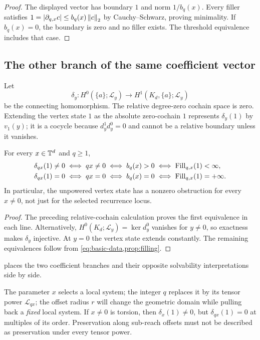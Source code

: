 \documentclass[11pt,a4paper]{article}
\begin{document}
\begin{proof}
The displayed vector has boundary $1$ and norm $1/b_q(x)$.  Every filler
satisfies $1=|\partial_{q,x}c|\leq b_q(x)\left\lVert c\right\rVert_2$ by
Cauchy--Schwarz, proving minimality.  If $b_q(x)=0$, the boundary is zero
and no filler exists.  The threshold equivalence includes that case.
\end{proof}

\subsection{The other branch of the same coefficient vector}

Let
\[
 \delta_y:H^0(\{a\};\mathcal L_y)\longrightarrow
                    H^1(K_d,\{a\};\mathcal L_y)
\]
be the connecting homomorphism.  The relative degree-zero cochain space
is zero.  Extending the vertex state $1$ as the absolute zero-cochain $1$
represents $\delta_y(1)$ by $v_1(y)$; it is a cocycle because
$d^1_y d^0_y=0$ and cannot be a relative boundary unless it vanishes.

\begin{proposition}
\label{prop:two-events}
For every $x\in\mathbb T^d$ and $q\geq1$,
\begin{align}
 \delta_{qx}(1)\ne0
  &\iff qx\ne0\iff b_q(x)>0\iff\operatorname{Fill}_{q,x}(1)<\infty,
  \label{eq:nontrivial-case}\\
 \delta_{qx}(1)=0
  &\iff qx=0\iff b_q(x)=0\iff\operatorname{Fill}_{q,x}(1)=+\infty.
  \label{eq:trivial-case}
\end{align}
In particular, the unpowered vertex state has a nonzero obstruction for
every $x\ne0$, not just for the selected recurrence locus.
\end{proposition}

\begin{proof}
The preceding relative-cochain calculation proves the first equivalence
in each line.  Alternatively, $H^0(K_d;\mathcal L_y)=\ker d^0_y$
vanishes for $y\ne0$, so exactness makes $\delta_y$ injective.  At $y=0$
the vertex state extends constantly.  The remaining equivalences follow
from \cref{eq:basic-data,prop:filling}.
\end{proof}

 places the two coefficient branches and
their opposite solvability interpretations side by side.


\begin{remark}\label{rem:three-scales}
The parameter $x$ selects a local system; the integer $q$ replaces it by
its tensor power $\mathcal L_{qx}$; the offset radius $r$ will change the
geometric domain while pulling back a \emph{fixed} local system.  If
$x\ne0$ is torsion, then $\delta_x(1)\ne0$, but $\delta_{qx}(1)=0$
at multiples of its order.  Preservation along sub-reach offsets must not
be described as preservation under every tensor power.
\end{remark}
\end{document}
